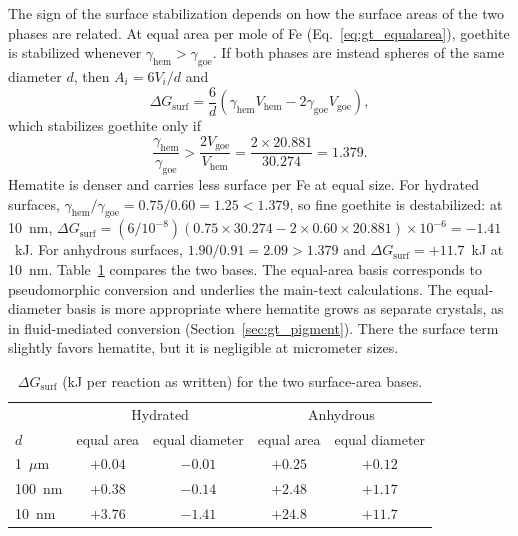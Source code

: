 The sign of the surface stabilization depends on how the surface areas of the two phases are
related. At equal area per mole of Fe (Eq.~\ref{eq:gt_equalarea}), goethite is stabilized
whenever $\gamma_{\mathrm{hem}}>\gamma_{\mathrm{goe}}$. If both phases are instead spheres of the
same diameter $d$, then $A_i = 6V_i/d$ and
\begin{equation}
  \Delta G_{\mathrm{surf}} = \frac{6}{d}\left(\gamma_{\mathrm{hem}}V_{\mathrm{hem}} - 2\gamma_{\mathrm{goe}}V_{\mathrm{goe}}\right),
\end{equation}
which stabilizes goethite only if
\begin{equation}
  \frac{\gamma_{\mathrm{hem}}}{\gamma_{\mathrm{goe}}} > \frac{2V_{\mathrm{goe}}}{V_{\mathrm{hem}}} = \frac{2\times20.881}{30.274} = 1.379 .
\end{equation}
Hematite is denser and carries less surface per Fe at equal size. For hydrated surfaces,
$\gamma_{\mathrm{hem}}/\gamma_{\mathrm{goe}} = 0.75/0.60 = 1.25 < 1.379$, so fine goethite is
destabilized: at 10~nm,
$\Delta G_{\mathrm{surf}} = (6/10^{-8})(0.75\times30.274 - 2\times0.60\times20.881)\times10^{-6} = -1.41$~kJ.
For anhydrous surfaces, $1.90/0.91 = 2.09 > 1.379$ and $\Delta G_{\mathrm{surf}} = +11.7$~kJ at
10~nm. Table~\ref{tab:gt_basis} compares the two bases. The equal-area basis corresponds to
pseudomorphic conversion and underlies the main-text calculations. The equal-diameter basis is
more appropriate where hematite grows as separate crystals, as in fluid-mediated conversion
(Section~\ref{sec:gt_pigment}). There the surface term slightly favors hematite, but it is
negligible at micrometer sizes.

\begin{table}
  \centering
  \caption{$\Delta G_{\mathrm{surf}}$ (kJ per reaction as written) for the two surface-area bases.}
  \label{tab:gt_basis}
  \begin{tabular}{lcccc}
    \hline
    & \multicolumn{2}{c}{Hydrated} & \multicolumn{2}{c}{Anhydrous} \\
    $d$ & equal area & equal diameter & equal area & equal diameter \\
    \hline
    1~$\mu$m & $+0.04$ & $-0.01$ & $+0.25$ & $+0.12$ \\
    100~nm & $+0.38$ & $-0.14$ & $+2.48$ & $+1.17$ \\
    10~nm & $+3.76$ & $-1.41$ & $+24.8$ & $+11.7$ \\
    \hline
  \end{tabular}
\end{table}


